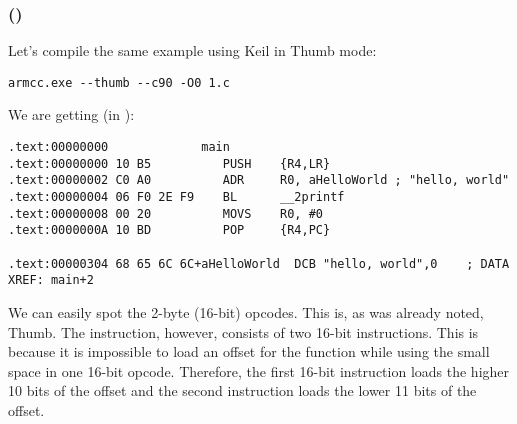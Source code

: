 \subsubsection{\NonOptimizingKeilVI (\ThumbMode)}

Let's compile the same example using Keil in Thumb mode:

\begin{lstlisting}
armcc.exe --thumb --c90 -O0 1.c 
\end{lstlisting}

We are getting (in \IDA):

\begin{lstlisting}[caption=\NonOptimizingKeilVI (\ThumbMode) + \IDA,style=customasmARM]
.text:00000000             main
.text:00000000 10 B5          PUSH    {R4,LR}
.text:00000002 C0 A0          ADR     R0, aHelloWorld ; "hello, world"
.text:00000004 06 F0 2E F9    BL      __2printf
.text:00000008 00 20          MOVS    R0, #0
.text:0000000A 10 BD          POP     {R4,PC}

.text:00000304 68 65 6C 6C+aHelloWorld  DCB "hello, world",0    ; DATA XREF: main+2
\end{lstlisting}

We can easily spot the 2-byte (16-bit) opcodes. This is, as was already noted, Thumb.
The  instruction, however, consists of two 16-bit instructions.
This is because it is impossible to load an offset for the \printf function while using the small space in one 16-bit opcode.
Therefore, the first 16-bit instruction loads the higher 10 bits of the offset and the second instruction loads 
the lower 11 bits of the offset.


